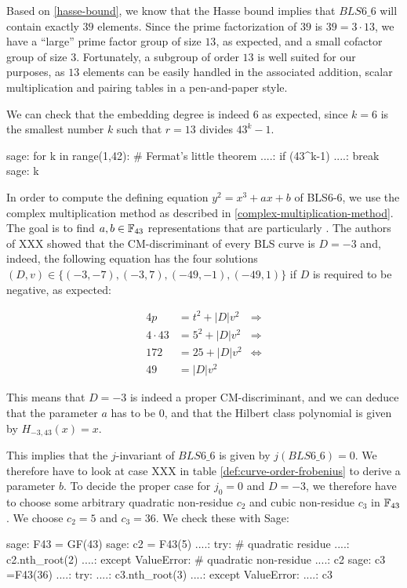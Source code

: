 Based on \ref{hasse-bound}, we know that the Hasse bound implies that $BLS6\_6$ will contain exactly $39$ elements. Since the prime factorization of $39$ is $39=3\cdot 13$, we have a ``large'' prime factor group of size $13$, as expected, and a small cofactor group of size $3$. Fortunately, a subgroup of order $13$ is well suited for our purposes, as $13$ elements can be easily handled in the associated addition, scalar multiplication and pairing tables in a pen-and-paper style. 

We can check that the embedding degree is indeed $6$ as expected, since $k = 6$ is the smallest number $k$ such that $r=13$ divides $43^k-1$. 
\begin{sagecommandline}
sage: for k in range(1,42): # Fermat's little theorem
....:     if (43^k-1)%
....:         break
sage: k
\end{sagecommandline}

In order to compute the defining equation $y^2=x^3 + ax + b$ of BLS6-6, we use the complex multiplication method as described in \ref{complex-multiplication-method}. The goal is to find $a,b\in\mathbb{F}_{43}$ representations that are particularly . The authors of XXX showed that the CM-discriminant of every BLS curve is $D=-3$ and, indeed, the following equation has the four solutions $(D,v)\in\{(-3,-7),(-3,7),(-49,-1),(-49,1)\}$ if $D$ is required to be negative, as expected: 

\begin{align*}
4p & = t^2 + |D|v^2 & \Rightarrow \\ 
4\cdot 43 & = 5^2 + |D|v^2 & \Rightarrow \\ 
172 & = 25 + |D| v^2 & \Leftrightarrow \\ 
49 & = |D| v^2
\end{align*}

This means that $D=-3$ is indeed a proper CM-discriminant, and we can deduce that the parameter $a$ has to be $0$, and that the Hilbert class polynomial is given by
$
H_{-3,43}(x) = x
$.

This implies that the $j$-invariant of $BLS6\_6$ is given by $j(BLS6\_6)=0$. We therefore have to look at case XXX in table \ref{def:curve-order-frobenius} to derive a parameter $b$. To decide the proper case for $j_0=0$ and $D=-3$, we therefore have to choose some arbitrary quadratic non-residue $c_2$ and cubic non-residue $c_3$ in $\mathbb{F}_{43}$. We choose $c_2 =5$ and $c_3=36$. We check these with Sage:
\begin{sagecommandline}
sage: F43 = GF(43)
sage: c2 = F43(5)
....: try: # quadratic residue
....:     c2.nth_root(2)
....: except ValueError: # quadratic non-residue
....:     c2
sage: c3 =F43(36)
....: try:
....:     c3.nth_root(3)
....: except ValueError:
....:     c3
\end{sagecommandline} 

